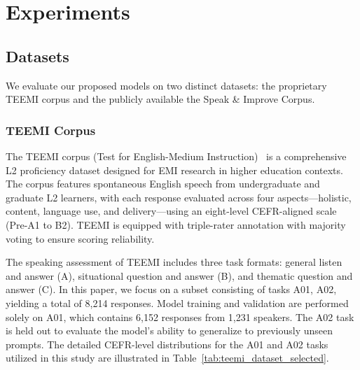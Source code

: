 \documentclass[conference]{IEEEtran}
\begin{document}
\section{Experiments}

\subsection{Datasets}
We evaluate our proposed models on two distinct datasets: the proprietary TEEMI corpus and the publicly available  the Speak \& Improve Corpus.

\subsubsection{TEEMI Corpus}

The TEEMI corpus (Test for English-Medium Instruction)~\cite{CorpusChen2024_teemi_interspeech} is a comprehensive L2 proficiency dataset designed for EMI research in higher education contexts. The corpus features spontaneous English speech from undergraduate and graduate L2 learners, with each response evaluated across four aspects—holistic, content, language use, and delivery—using an eight-level CEFR-aligned scale (Pre-A1 to B2).  TEEMI is equipped with triple-rater annotation with majority voting to ensure scoring reliability.

The speaking assessment of TEEMI includes three task formats: general listen and answer (A), situational question and answer (B), and thematic question and answer (C). In this paper, we focus on a subset consisting of tasks A01, A02, yielding a total of 8,214 responses. Model training and validation are performed solely on A01, which contains 6,152 responses from 1,231 speakers. The A02 task is held out to evaluate the model’s ability to generalize to previously unseen prompts. The detailed CEFR-level distributions for the A01 and A02 tasks utilized in this study are illustrated in Table~\ref{tab:teemi_dataset_selected}.

\begin{table}[!ht]
\centering
\caption{Statistical information for selected CEFR proficiency levels (A01, A02) in the TEEMI dataset.}
\label{tab:teemi_dataset_selected}
\end{table}
\end{document}
